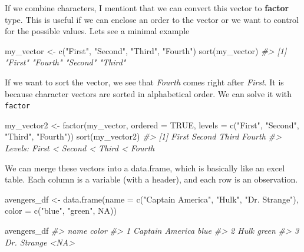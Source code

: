 \documentclass[
]{article}
\newenvironment{Shaded}{\begin{snugshade}}{\end{snugshade}}
\newcommand{\AttributeTok}[1]{\textcolor[rgb]{0.77,0.63,0.00}{#1}}
\newcommand{\CommentTok}[1]{\textcolor[rgb]{0.56,0.35,0.01}{\textit{#1}}}
\newcommand{\ConstantTok}[1]{\textcolor[rgb]{0.00,0.00,0.00}{#1}}
\newcommand{\FunctionTok}[1]{\textcolor[rgb]{0.00,0.00,0.00}{#1}}
\newcommand{\NormalTok}[1]{#1}
\newcommand{\OtherTok}[1]{\textcolor[rgb]{0.56,0.35,0.01}{#1}}
\newcommand{\StringTok}[1]{\textcolor[rgb]{0.31,0.60,0.02}{#1}}
\begin{document}
If we combine characters, I mentiont that we can convert this vector to \textbf{factor} type. This is useful if we can enclose an order to the vector or we want to control for the possible values.
Lets see a minimal example

\begin{Shaded}
\begin{Highlighting}[]
\NormalTok{my\_vector }\OtherTok{\textless{}{-}} \FunctionTok{c}\NormalTok{(}\StringTok{"First"}\NormalTok{, }\StringTok{"Second"}\NormalTok{, }\StringTok{"Third"}\NormalTok{, }\StringTok{"Fourth"}\NormalTok{)}
\FunctionTok{sort}\NormalTok{(my\_vector)}
\CommentTok{\#\textgreater{} [1] "First"  "Fourth" "Second" "Third"}
\end{Highlighting}
\end{Shaded}

If we want to sort the vector, we see that \emph{Fourth} comes right after \emph{First}. It is because character vectors are sorted in alphabetical order. We can solve it with \texttt{factor}

\begin{Shaded}
\begin{Highlighting}[]
\NormalTok{my\_vector2 }\OtherTok{\textless{}{-}} \FunctionTok{factor}\NormalTok{(my\_vector, }\AttributeTok{ordered =} \ConstantTok{TRUE}\NormalTok{, }\AttributeTok{levels =} \FunctionTok{c}\NormalTok{(}\StringTok{"First"}\NormalTok{, }\StringTok{"Second"}\NormalTok{, }\StringTok{"Third"}\NormalTok{, }\StringTok{"Fourth"}\NormalTok{))}
\FunctionTok{sort}\NormalTok{(my\_vector2)}
\CommentTok{\#\textgreater{} [1] First  Second Third  Fourth}
\CommentTok{\#\textgreater{} Levels: First \textless{} Second \textless{} Third \textless{} Fourth}
\end{Highlighting}
\end{Shaded}

We can merge these vectors into a data.frame, which is basically like an excel table. Each column is a variable (with a header), and each row is an observation.

\begin{Shaded}
\begin{Highlighting}[]
\NormalTok{avengers\_df }\OtherTok{\textless{}{-}} \FunctionTok{data.frame}\NormalTok{(}\AttributeTok{name =} \FunctionTok{c}\NormalTok{(}\StringTok{"Captain America"}\NormalTok{, }\StringTok{"Hulk"}\NormalTok{, }\StringTok{"Dr. Strange"}\NormalTok{), }
           \AttributeTok{color =} \FunctionTok{c}\NormalTok{(}\StringTok{"blue"}\NormalTok{, }\StringTok{"green"}\NormalTok{, }\ConstantTok{NA}\NormalTok{))}

\NormalTok{avengers\_df}
\CommentTok{\#\textgreater{}              name color}
\CommentTok{\#\textgreater{} 1 Captain America  blue}
\CommentTok{\#\textgreater{} 2            Hulk green}
\CommentTok{\#\textgreater{} 3     Dr. Strange  \textless{}NA\textgreater{}}
\end{Highlighting}
\end{Shaded}
\end{document}
